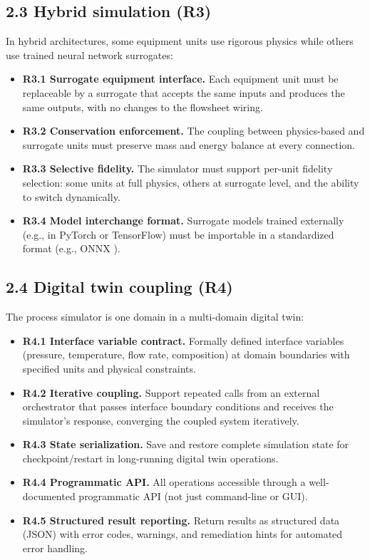 \documentclass[review,3p]{custom}
\begin{document}
\subsection{2.3 Hybrid simulation (R3)}

In hybrid architectures, some equipment units use rigorous physics while others use trained neural network surrogates:

\begin{itemize}
  \item \textbf{R3.1 Surrogate equipment interface.} Each equipment unit must be replaceable by a surrogate that accepts the same inputs and produces the same outputs, with no changes to the flowsheet wiring.
  \item \textbf{R3.2 Conservation enforcement.} The coupling between physics-based and surrogate units must preserve mass and energy balance at every connection.
  \item \textbf{R3.3 Selective fidelity.} The simulator must support per-unit fidelity selection: some units at full physics, others at surrogate level, and the ability to switch dynamically.
  \item \textbf{R3.4 Model interchange format.} Surrogate models trained externally (e.g., in PyTorch or TensorFlow) must be importable in a standardized format (e.g., ONNX \cite{ONNX2019}).
\end{itemize}

\subsection{2.4 Digital twin coupling (R4)}

The process simulator is one domain in a multi-domain digital twin:

\begin{itemize}
  \item \textbf{R4.1 Interface variable contract.} Formally defined interface variables (pressure, temperature, flow rate, composition) at domain boundaries with specified units and physical constraints.
  \item \textbf{R4.2 Iterative coupling.} Support repeated calls from an external orchestrator that passes interface boundary conditions and receives the simulator's response, converging the coupled system iteratively.
  \item \textbf{R4.3 State serialization.} Save and restore complete simulation state for checkpoint/restart in long-running digital twin operations.
  \item \textbf{R4.4 Programmatic API.} All operations accessible through a well-documented programmatic API (not just command-line or GUI).
  \item \textbf{R4.5 Structured result reporting.} Return results as structured data (JSON) with error codes, warnings, and remediation hints for automated error handling.
\end{itemize}
\end{document}
